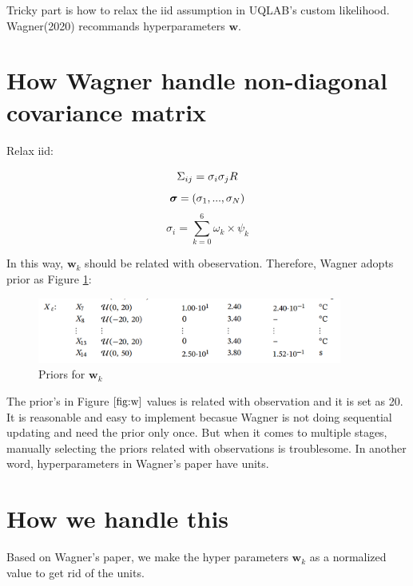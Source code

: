 \documentclass[12pt]{article}%
\theoremstyle{thmstyleone}%
\theoremstyle{thmstyletwo}%
\theoremstyle{thmstylethree}%
\begin{document}
Tricky part is how to relax the iid assumption in UQLAB's custom likelihood. Wagner(2020) recommands hyperparameters $\boldsymbol{w}$.

\section{How Wagner handle non-diagonal covariance matrix}

Relax iid:

\begin{equation}
        \Sigma_{ij} = \sigma_{i}\sigma_{j}R \\
        \end{equation}
        \begin{equation}
           \boldsymbol{\sigma} = (\sigma_1,...,\sigma_N) \\ 
        \end{equation}
        \begin{equation}
\sigma_{i} = \sum_{k=0}^{6} \omega_{k} \times \psi_{k} 
        \end{equation}

In this way, $\boldsymbol{w}_{k}$ should be related with obeservation. Therefore, Wagner adopts prior as Figure \ref{fig:w}:
\begin{figure}[H]
    \centering
    \includegraphics[width = 10cm]{w_prior.png}
    \caption{Priors for $\boldsymbol{w}_{k}$}
    \label{fig:w}
\end{figure}

The prior's in Figure $\ref{fig:w}$ values is related with observation and it is set as 20. It is reasonable and easy to implement becasue Wagner is not doing sequential updating and need the prior only once. But when it comes to multiple stages, manually selecting the priors related with observations is troublesome. In another word, hyperparameters in Wagner's paper have units.






\section{How we handle this}

Based on Wagner's paper, we make the hyper parameters $\boldsymbol{w}_{k}$ as a normalized value to get rid of the units.
\end{document}
